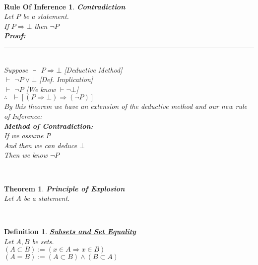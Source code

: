 \documentclass[12pt]{extarticle}
\theoremstyle{plain}
\newtheorem{thm}{Theorem}[section]
\theoremstyle{plain}
\theoremstyle{plain}
\theoremstyle{Definition}
\newtheorem{def.}{Definition}[section]
\theoremstyle{Definition}
\theoremstyle{plain}
\theoremstyle{plain}
\newtheorem{ruleOfInference}{Rule Of Inference}[section]
\newcommand{\cut}[0]{\noindent\framebox[\linewidth]{\rule{\linewidth}{2pt}}\\}
\newcommand{\prof}[0]{	\noindent \textbf{Proof:} \rule{500pt}{2pt} \\ }
\newcommand{\ddash}{\boxed{\vdash}}
\begin{document}
\cut 
\begin{ruleOfInference} \textbf{Contradiction} \\ 
	Let $P$ be a statement. \\ 
	If $P \Rightarrow \bot$ then $\lnot P$ \\ 
	\prof 
	Suppose  $\ddash$ $P \Rightarrow \bot$ \hfill [Deductive Method] \\
	$\ddash$ $\lnot P \lor \bot$ \hfill [Def. Implication] \\ 
	$\ddash$ $\lnot P$ \hfill [We know $\vdash \lnot \bot$] \\
	$\therefore \text{ } \vdash [(P \Rightarrow \bot) \Rightarrow (\lnot P)]$ \\
	By this theorem we have an extension of the deductive method and our new rule of Inference:\\
	\textbf{Method of Contradiction: }\\
	If we assume P \\
	And then we can deduce $\bot$ \\ 
	Then we know $\lnot P$ 
\end{ruleOfInference}
\cut
\begin{thm} \textbf{Principle of Explosion} \\ 
	Let $A$ be a statement. \\
\end{thm}
\cut
\begin{def.} \underline{\textbf{Subsets and Set Equality}} \\ 
	Let $A,B$ be sets. \\ 
	$(A \subset B) := (x \in A \Rightarrow x \in B)$ \\
	$(A = B) := (A \subset B) \wedge (B \subset A)$
\end{def.}
\cut
\end{document}
